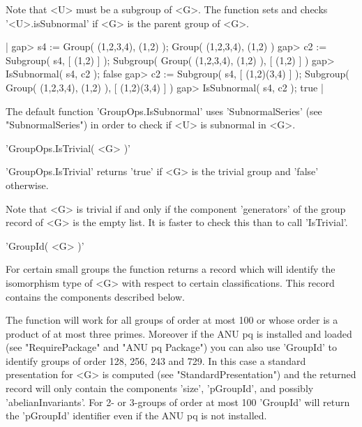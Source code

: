 Note that <U> must be  a  subgroup of  <G>. The function  sets and checks
'<U>.isSubnormal' if <G> is the parent group of <G>.

|    gap> s4 := Group( (1,2,3,4), (1,2) );
    Group( (1,2,3,4), (1,2) )
    gap> c2 := Subgroup( s4, [ (1,2) ] );
    Subgroup( Group( (1,2,3,4), (1,2) ), [ (1,2) ] )
    gap> IsSubnormal( s4, c2 );
    false
    gap> c2 := Subgroup( s4, [ (1,2)(3,4) ] );
    Subgroup( Group( (1,2,3,4), (1,2) ), [ (1,2)(3,4) ] )
    gap> IsSubnormal( s4, c2 );
    true |

The default  function  'GroupOps.IsSubnormal' uses 'SubnormalSeries' (see
"SubnormalSeries") in order to check if <U> is subnormal in <G>.

%

'GroupOps.IsTrivial( <G> )'

'GroupOps.IsTrivial'  returns 'true'  if  <G> is the   trivial  group and
'false' otherwise.

Note that <G> is trivial if and only if the component 'generators' of the
group record of <G> is the empty list.  It is  faster  to check this than
to call 'IsTrivial'.


'GroupId( <G> )'

For certain   small  groups the function  returns   a  record  which will
identify   the  isomorphism  type    of   <G>  with  respect  to  certain
classifications.  This record contains the components described below.

The function will work for all groups of order at most 100 or whose order
is a  product of  at  most  three primes.   Moreover   if the ANU  pq  is
installed and loaded (see "RequirePackage" and "ANU  pq Package") you can
also use 'GroupId' to identify groups of order 128, 256, 243 and 729.  In
this  case   a standard    presentation    for  <G>  is  computed    (see
"StandardPresentation") and the returned record   will only contain   the
components 'size', 'pGroupId',  and possibly 'abelianInvariants'.  For 2-
or 3-groups  of order at  most 100 'GroupId'  will  return the 'pGroupId'
identifier even if the ANU pq is not installed.

